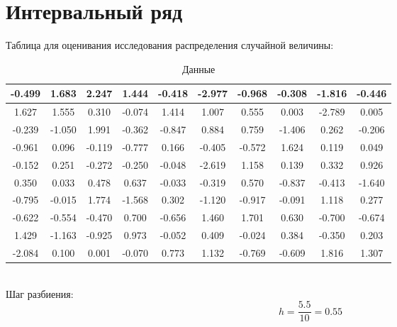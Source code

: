 \documentclass{article}
\begin{document}
\section{Интервальный ряд}
Таблица для оценивания исследования распределения случайной величины:
\begin{table}[h]
    \centering
    \begin{tabular}{|*{10}{c|}}
        \hline
        -0.499 & 1.683 & 2.247 & 1.444 & -0.418 & -2.977 & -0.968 & -0.308 & -1.816 & -0.446 \\
        \hline
        1.627 & 1.555 & 0.310 & -0.074 & 1.414 & 1.007 & 0.555 & 0.003 & -2.789 & 0.005 \\
        \hline
        -0.239 & -1.050 & 1.991 & -0.362 & -0.847 & 0.884 & 0.759 & -1.406 & 0.262 & -0.206 \\
        \hline
        -0.961 & 0.096 & -0.119 & -0.777 & 0.166 & -0.405 & -0.572 & 1.624 & 0.119 & 0.049 \\
        \hline
        -0.152 & 0.251 & -0.272 & -0.250 & -0.048 & -2.619 & 1.158 & 0.139 & 0.332 & 0.926 \\
        \hline
        0.350 & 0.033 & 0.478 & 0.637 & -0.033 & -0.319 & 0.570 & -0.837 & -0.413 & -1.640 \\
        \hline
        -0.795 & -0.015 & 1.774 & -1.568 & 0.302 & -1.120 & -0.917 & -0.091 & 1.118 & 0.277 \\
        \hline
        -0.622 & -0.554 & -0.470 & 0.700 & -0.656 & 1.460 & 1.701 & 0.630 & -0.700 & -0.674 \\
        \hline
        1.429 & -1.163 & -0.925 & 0.973 & -0.052 & 0.409 & -0.024 & 0.384 & -0.350 & 0.203 \\
        \hline
        -2.084 & 0.100 & 0.001 & -0.070 & 0.773 & 1.132 & -0.769 & -0.609 & 1.816 & 1.307 \\
        \hline
    \end{tabular}
    \caption{Данные}
\end{table}
\\
Шаг разбиения:
\begin{equation*}
    h = \frac{5.5}{10} = 0.55
\end{equation*}
\end{document}
